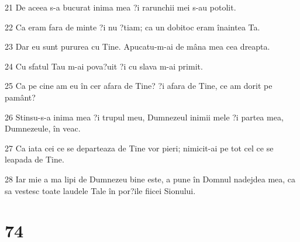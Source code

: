 \par 21 De aceea s-a bucurat inima mea ?i rarunchii mei s-au potolit.
\par 22 Ca eram fara de minte ?i nu ?tiam; ca un dobitoc eram înaintea Ta.
\par 23 Dar eu sunt pururea cu Tine. Apucatu-m-ai de mâna mea cea dreapta.
\par 24 Cu sfatul Tau m-ai pova?uit ?i cu slava m-ai primit.
\par 25 Ca pe cine am eu în cer afara de Tine? ?i afara de Tine, ce am dorit pe pamânt?
\par 26 Stinsu-s-a inima mea ?i trupul meu, Dumnezeul inimii mele ?i partea mea, Dumnezeule, în veac.
\par 27 Ca iata cei ce se departeaza de Tine vor pieri; nimicit-ai pe tot cel ce se leapada de Tine.
\par 28 Iar mie a ma lipi de Dumnezeu bine este, a pune în Domnul nadejdea mea, ca sa vestesc toate laudele Tale în por?ile fiicei Sionului.

\chapter{74}


